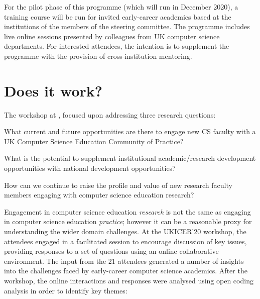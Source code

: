 \documentclass[sigconf]{acmart}
\begin{document}
For the pilot phase of this programme (which will run in December
2020), a training course will be run for invited early-career
academics based at the institutions of the members of the steering
committee. The programme includes live online sessions presented by
colleagues from UK computer science departments. For interested
attendees, the intention is to supplement the programme with the
provision of cross-institution mentoring.

\section{Does it work?}	

The workshop  at , focused upon addressing three research questions:
\begin{compactenum}[i)]
\item What current and future opportunities are there to engage new CS faculty with a UK Computer Science Education Community of Practice?
\item What is the potential to supplement institutional academic/research development opportunities with national development opportunities?
\item How can we continue to raise the profile and value of new research faculty members engaging with computer science education research?
\end{compactenum}
Engagement in computer science education {\emph{research}} is not the same as engaging in computer science education {\emph{practice}}; however it can be a reasonable proxy for understanding the wider domain challenges. At the UKICER'20 workshop, the attendees engaged in a facilitated session to encourage discussion of key issues, providing responses to a set of questions using an online collaborative environment. The input from the 21 attendees generated a number of insights into the challenges faced by early-career computer science academics. After the workshop, the online interactions and responses were analysed using open coding analysis in order to identify key themes:
\end{document}
